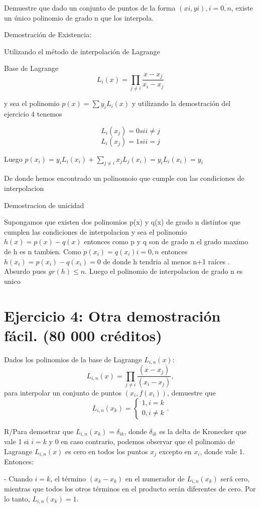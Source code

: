 \documentclass[a4paper,12pt]{article}
\begin{document}
Demuestre que dado un conjunto de puntos de la forma ${(xi , yi ), i = \overline{0, n}}$, existe un único polinomio
de grado n que los interpola.


Demostración de Existencia:

Utilizando el método de interpolación de Lagrange

Base de Lagrange
\[L_i(x)=\prod_{j \neq i}\frac{x-x_j}{x_i-x_j} \]

y sea el polinomio $p(x)=\sum y_i L_i(x)$  y utilizando la demostración del ejercicio 4 tenemos

\[L_i(x_j)=0 si   i\neq j \]
\[L_i(x_j)=1 si   i=j \]

Luego $p(x_i)= y_i L_i(x_i) +\sum_{j \neq i} x_jL_j(x_i)= y_i L_i(x_i)= y_i$

De donde hemos encontrado un polinomoio que cumple con las condiciones de interpolacion

Demostracion de unicidad

Supongamos que existen dos polinomios p(x) y q(x) de grado n distintos que cumplen las condiciones de interpolacion y sea el polinomio $h(x)=p(x)-q(x)$ entonces como p y q son de grado n el grado maximo de h es n tambien.
Como $p(x_i)=q(x_i) i= \overline{0,n}$ entonces $h(x_i)=p(x_i)-q(x_i)=0$
de donde h tendria al menos n+1 raíces . Absurdo pues $gr(h) \leq n$. Luego el polinomio de interpolacion de grado n es unico


\section*{Ejercicio 4: Otra demostración fácil. (80 000 créditos)}

Dados los polinomios de la base de Lagrange $L_{i,n}(x)$:
\[ L_{i,n}(x) = \prod_{j \neq i} \frac{(x - x_j)}{(x_i - x_j)}, \]
para interpolar un conjunto de puntos $(x_i, f(x_i))$, demuestre que
\[ L_{i,n}(x_k) = \begin{cases} 1, i = k \\ 0, i  \neq k \end{cases}. \]

R/Para demostrar que \( L_{i,n}(x_k) = \delta_{ik} \), donde \( \delta_{ik} \) es la delta de Kronecker que vale 1 si \( i = k \) y 0 en caso contrario, podemos observar que el polinomio de Lagrange \( L_{i,n}(x) \) es cero en todos los puntos \( x_j \) excepto en \( x_i \), donde vale 1. Entonces:

- Cuando \( i = k \), el término \( (x_k - x_k) \) en el numerador de \( L_{i,n}(x_k) \) será cero, mientras que todos los otros términos en el producto serán diferentes de cero. Por lo tanto, \( L_{i,n}(x_k) = 1 \).
\end{document}
